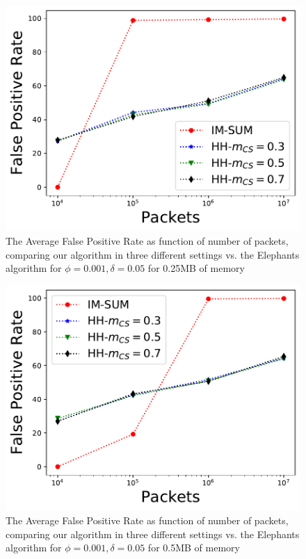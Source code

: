 \begin{figure} \centering
    \includegraphics[width=\linewidth]{HH/figures/FPR_per_pkts_m=0.25.pdf}
    \caption[Average False Positive for 0.25MB of memory]{The Average False Positive Rate as function of number of packets, comparing our algorithm in three different settings vs. the Elephants algorithm for $\phi=0.001,\delta=0.05$ for 0.25MB of memory}
    \label{fig:fig3_d}
\end{figure}
\begin{figure} \centering
    \includegraphics[width=\linewidth]{HH/figures/FPR_per_pkts_m=0.5.pdf}
        \caption[Average False Positive for 0.5MB of memory]{The Average False Positive Rate as function of number of packets, comparing our algorithm in three different settings vs. the Elephants algorithm for $\phi=0.001,\delta=0.05$ for 0.5MB of memory}
    \label{fig:fig3_e}
\end{figure}
